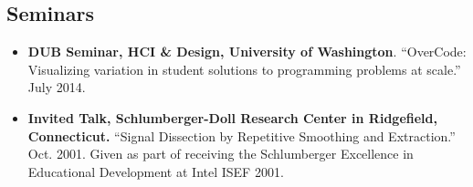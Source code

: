 \documentclass[margin]{res}
\begin{document}
\begin{resume}
\section{Seminars}
\begin{itemize}[leftmargin=*]
\item {\bf DUB Seminar, HCI \& Design, University of Washington}. ``OverCode: Visualizing variation in student solutions to programming problems at scale.'' \hfill July 2014.
\item {\bf Invited Talk, Schlumberger-Doll Research Center in Ridgefield, Connecticut.} ``Signal Dissection by Repetitive Smoothing and Extraction.'' \hfill Oct. 2001.
Given as part of receiving the Schlumberger Excellence in Educational Development at Intel ISEF 2001.
\end{itemize}
 

\end{resume}
\end{document}
